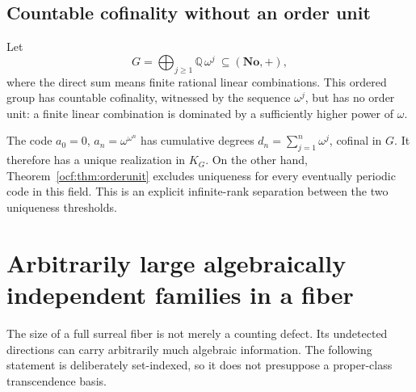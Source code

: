 \documentclass[11pt,a4paper]{article}
\numberwithin{equation}{section}
\theoremstyle{definition}
\theoremstyle{remark}
\newcommand{\No}{\mathbf{No}}
\newcommand{\Q}{\mathbb Q}
\begin{document}
\subsection{Countable cofinality without an order unit}

Let
\[
 G=\bigoplus_{j\ge1}\Q\,\omega^j\ \subseteq(\No,+),
\]
where the direct sum means finite rational linear combinations. This
ordered group has countable cofinality, witnessed by the sequence
$\omega^j$, but has no order unit: a finite linear combination is dominated
by a sufficiently higher power of $\omega$.

The code $a_0=0$, $a_n=\omega^{\omega^n}$ has cumulative degrees
$d_n=\sum_{j=1}^n\omega^j$, cofinal in $G$. It therefore has a unique
realization in $K_G$. On the other hand,
Theorem~\ref{ocf:thm:orderunit} excludes uniqueness for every eventually
periodic code in this field. This is an explicit infinite-rank separation
between the two uniqueness thresholds.

\section{Arbitrarily large algebraically independent families in a fiber}
\label{ocf:sec:independence}

The size of a full surreal fiber is not merely a counting defect. Its
undetected directions can carry arbitrarily much algebraic information.
The following statement is deliberately set-indexed, so it does not
presuppose a proper-class transcendence basis.
\end{document}
